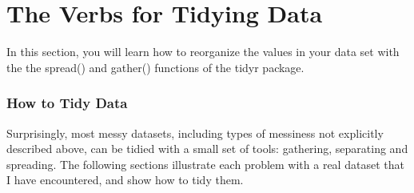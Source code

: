 \documentclass[TIDYMASTER.tex]{subfiles}
\begin{document}
 
	
	\section{The Verbs for Tidying Data}

\begin{frame}
In this section, you will learn how to reorganize the values in your data set with the the spread() and gather() functions of the tidyr package.
\end{frame}
\begin{frame}
\frametitle{How to Tidy Data}

Surprisingly, most messy datasets, including types of messiness not explicitly described above, can be tidied with a small set of tools: gathering, separating and spreading. The following sections illustrate each problem with a real dataset that I have encountered, and show how to tidy them.
\end{frame}
\end{document}
